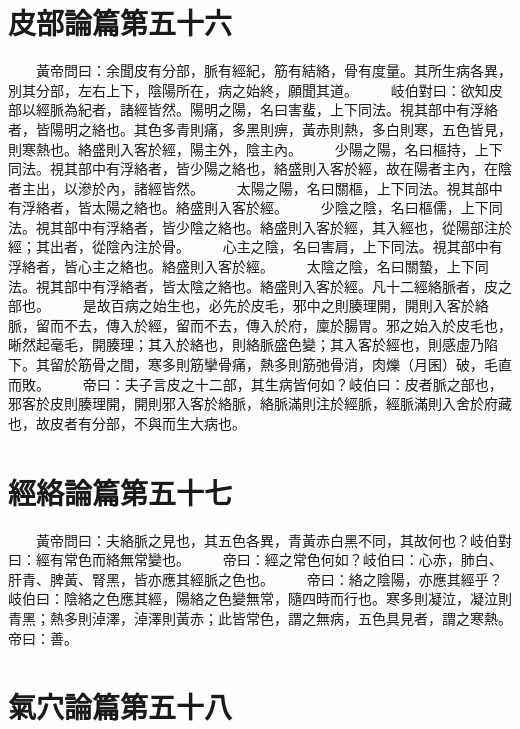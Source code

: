 \section{皮部論篇第五十六}

　　黃帝問曰：余聞皮有分部，脈有經紀，筋有結絡，骨有度量。其所生病各異，別其分部，左右上下，陰陽所在，病之始終，願聞其道。
　　岐伯對曰：欲知皮部以經脈為紀者，諸經皆然。陽明之陽，名曰害蜚，上下同法。視其部中有浮絡者，皆陽明之絡也。其色多青則痛，多黑則痹，黃赤則熱，多白則寒，五色皆見，則寒熱也。絡盛則入客於經，陽主外，陰主內。
　　少陽之陽，名曰樞持，上下同法。視其部中有浮絡者，皆少陽之絡也，絡盛則入客於經，故在陽者主內，在陰者主出，以滲於內，諸經皆然。
　　太陽之陽，名曰關樞，上下同法。視其部中有浮絡者，皆太陽之絡也。絡盛則入客於經。
　　少陰之陰，名曰樞儒，上下同法。視其部中有浮絡者，皆少陰之絡也。絡盛則入客於經，其入經也，從陽部注於經；其出者，從陰內注於骨。
　　心主之陰，名曰害肩，上下同法。視其部中有浮絡者，皆心主之絡也。絡盛則入客於經。
　　太陰之陰，名曰關蟄，上下同法。視其部中有浮絡者，皆太陰之絡也。絡盛則入客於經。凡十二經絡脈者，皮之部也。
　　是故百病之始生也，必先於皮毛，邪中之則腠理開，開則入客於絡脈，留而不去，傳入於經，留而不去，傳入於府，廩於腸胃。邪之始入於皮毛也，晰然起毫毛，開腠理；其入於絡也，則絡脈盛色變；其入客於經也，則感虛乃陷下。其留於筋骨之間，寒多則筋攣骨痛，熱多則筋弛骨消，肉爍（月囷）破，毛直而敗。
　　帝曰：夫子言皮之十二部，其生病皆何如？岐伯曰：皮者脈之部也，邪客於皮則腠理開，開則邪入客於絡脈，絡脈滿則注於經脈，經脈滿則入舍於府藏也，故皮者有分部，不與而生大病也。


\section{經絡論篇第五十七}

　　黃帝問曰：夫絡脈之見也，其五色各異，青黃赤白黑不同，其故何也？岐伯對曰：經有常色而絡無常變也。
　　帝曰：經之常色何如？岐伯曰：心赤，肺白、肝青、脾黃、腎黑，皆亦應其經脈之色也。
　　帝曰：絡之陰陽，亦應其經乎？岐伯曰：陰絡之色應其經，陽絡之色變無常，隨四時而行也。寒多則凝泣，凝泣則青黑；熱多則淖澤，淖澤則黃赤；此皆常色，謂之無病，五色具見者，謂之寒熱。帝曰：善。


\section{氣穴論篇第五十八}

